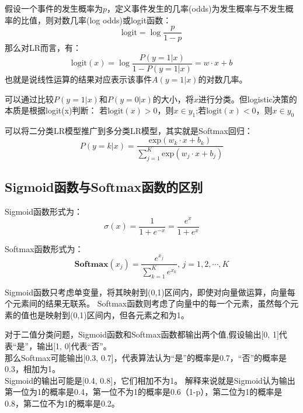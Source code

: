 假设一个事件的发生概率为$p$，定义事件发生的几率(odds)为发生概率与不发生概率的比值，则对数几率(log odds)或logit函数：
\begin{equation*}
    \text{logit} = \log \frac{p}{1-p}
\end{equation*}
那么对LR而言，有：
\begin{equation*}
    \text{logit}(x) = \log\frac{P(y=1|x)}{1-P({y=1|x})} = w\cdot x + b
\end{equation*}
也就是说线性运算的结果对应表示该事件$A(y=1|x)$的对数几率。

可以通过比较$P(y=1|x)$和$P(y=0|x)$的大小，将$x$进行分类。但logistic决策的本质是根据logit(x)判断：
若$\text{logit}(x) > 0$，则$x\in y_1$;若$\text{logit}(x) < 0$，则$x\in y_0$

可以将二分类LR模型推广到多分类LR模型，其实就是Softmax回归：
\begin{equation*}
    P(y=k|x) = \frac{\text{exp}(w_k\cdot x + b_k)}{\sum_{j=1}^K \text{exp}(w_j \cdot x + b_j)}
\end{equation*}

\subsection{Sigmoid函数与Softmax函数的区别}
Sigmoid函数形式为：
\begin{equation*}
    \sigma(x) = \frac{1}{1 + e^{-x}} = \frac{e^{x}}{1 + e^{x}}
\end{equation*}

Softmax函数形式为：
\begin{equation*}
    \textbf{Softmax}(x_j) = \frac{e^{x_j}}{\sum_{k=1}^K e^{x_k}},\, j=1,2,\cdots,K
\end{equation*}

Sigmoid函数只考虑单变量，将其映射到(0,1)区间内，即使对向量做运算，向量每个元素间的结果无联系。
Softmax函数则考虑了向量中的每一个元素，虽然每个元素的值也是映射到(0,1)区间内，但各元素之和为1。

对于二值分类问题，Sigmoid函数和Softmax函数都输出两个值,假设输出[0, 1]代表“是”，输出[1, 0]代表“否”。\\
那么Softmax可能输出[0.3, 0.7]，代表算法认为“是”的概率是0.7，“否”的概率是0.3，相加为1。\\
Sigmoid的输出可能是[0.4, 0.8]，它们相加不为1。
解释来说就是Sigmoid认为输出第一位为1的概率是0.4，第一位不为1的概率是0.6（1-p），第二位为1的概率是0.8，第二位不为1的概率是0.2。

